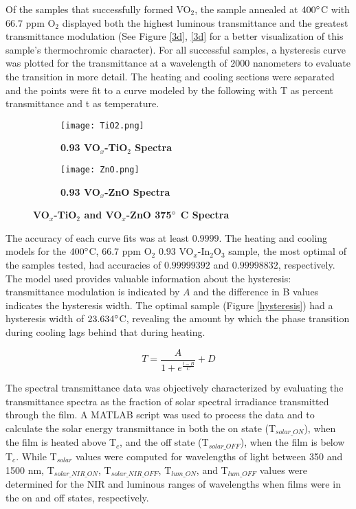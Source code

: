 \documentclass[a4paper]{article}
\begin{document}
Of the samples that successfully formed VO$_2$, the sample annealed at $400\degree$C with $66.7$ ppm O$_2$ displayed both the highest luminous transmittance and the greatest transmittance modulation (See Figure \ref{3d}, \ref{3d} for a better visualization of this sample's thermochromic character). For all successful samples, a hysteresis curve was plotted for the transmittance at a wavelength of $2000$ nanometers to evaluate the transition in more detail. The heating and cooling sections were separated and the points were fit to a curve modeled by the following with T as percent transmittance and t as temperature.   

\begin{figure*}
\centering
\begin{subfigure}{.5\textwidth}
    \centering
    \texttt{[image: TiO2.png]}
    \caption{\textbf{0.93 VO$_x$-TiO$_2$ Spectra}}
    \label{Ti}
\end{subfigure}%
\begin{subfigure}{.5\textwidth}
  \centering
  \texttt{[image: ZnO.png]}
  \caption{\textbf{0.93 VO$_x$-ZnO Spectra}}
  \label{ZnO}
\end{subfigure}
\caption{\textbf{VO$_x$-TiO$_2$ and VO$_x$-ZnO 375$\degree$ C Spectra}}
\label{spectra}
\end{figure*}


The accuracy of each curve fits was at least $0.9999$. The heating and cooling models for the $400\degree$C, $66.7$ ppm O$_2$ $0.93$ VO$_x$-In$_2$O$_3$ sample, the most optimal of the samples tested, had accuracies of $0.99999392$ and $0.99998832$, respectively. The model used provides valuable information about the hysteresis: transmittance modulation is indicated by $A$ and the difference in B values indicates the hysteresis width. The optimal sample (Figure \ref{hysteresis}) had a hysteresis width of $23.634\degree$C, revealing the amount by which the phase transition during cooling lags behind that during heating. 

\[T=\frac{A}{1+e^{\frac{t-B}{C}}}+D\]

The spectral transmittance data was objectively characterized by evaluating the transmittance spectra as the fraction of solar spectral irradiance transmitted through the film. A MATLAB script was used to process the data and to calculate the solar energy transmittance in both the on state (T$_{solar\_ON}$), when the film is heated above T$_{c}$, and the off state (T$_{solar\_OFF}$), when the film is below T$_{c}$. While T$_{solar}$ values were computed for wavelengths of light between 350 and 1500 nm, T$_{solar\_NIR\_ON}$, T$_{solar\_NIR\_OFF}$, T$_{lum\_ON}$, and T$_{lum\_OFF}$ values were determined for the NIR and luminous ranges of wavelengths when films were in the on and off states, respectively. 
    
\end{document}
